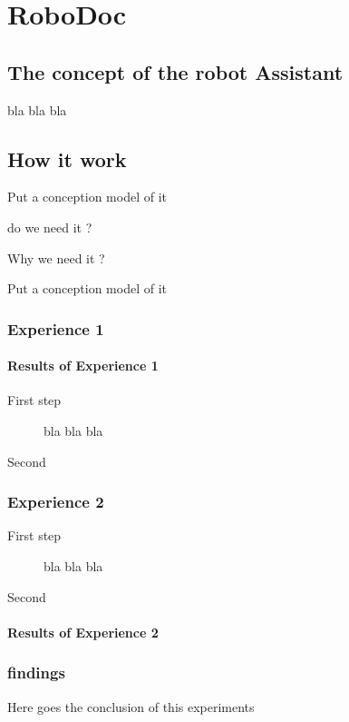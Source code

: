 \chapter{RoboDoc}

\section{The concept of the robot Assistant}
\label{sec:robotassistant}

bla bla bla

\section{How it work}
Put a conception model of it

do we need it ?

Why we need it ?

Put a conception model of it
\subsection{Experience 1 }

\subsubsection{Results of Experience 1}

\begin{description}
	\item[First step ] bla bla bla
	\item[Second ]  
	
\end{description}

\subsection{Experience 2 }
\begin{description}
	\item[First step ] bla bla bla
	\item[Second ]  
	
\end{description}
\subsubsection{Results of Experience 2}


\subsection{findings}
Here goes the conclusion of this experiments